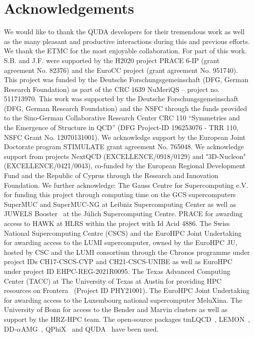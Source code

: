 \documentclass[a4paper,11pt]{article}
\begin{document}
\section{Acknowledgements}
{
\small
We would like to thank the QUDA developers for their tremendous work as well as the many pleasant and productive interactions during this and previous efforts. 
We thank the ETMC for the most enjoyable collaboration. 
For part of this work. S.B. and J.F. were supported by the H2020 project PRACE 6-IP (grant agreement No. 82376) and the EuroCC project (grant agreement No. 951740).
This project was funded by the Deutsche Forschungsgemeinschaft (DFG, German Research Foundation) as part of the CRC 1639 NuMeriQS – project no. 511713970. 
This work was supported by the Deutsche Forschungsgemeinschaft (DFG, German Research Foundation) and the NSFC through the funds provided to the Sino-German Collaborative Research Center CRC 110 “Symmetries and the Emergence of Structure in QCD” (DFG Project-ID 196253076 - TRR 110, NSFC Grant No. 12070131001).
We acknowledge support by the European Joint Doctorate program STIMULATE grant agreement No. 765048.
We acknowledge support from projects NextQCD (EXCELLENCE/0918/0129) and "3D-Nucleon" (EXCELLENCE/0421/0043), co-funded by the European Regional Development Fund and the Republic of Cyprus through the Research and Innovation Foundation. 
We further acknowledge: The Gauss Centre for Supercomputing e.V. for funding this project through computing time on the GCS supercomputers SuperMUC and SuperMUC-NG at Leibniz Supercomputing Center as well as JUWELS Booster~\cite{JUWELS,BOOSTER} at the Jülich Supercomputing Centre.
PRACE for awarding access to HAWK at HLRS within the project with Id Acid 4886. 
The Swiss National Supercomputing Centre (CSCS) and the EuroHPC Joint Undertaking for awarding access to the LUMI supercomputer, owned by the EuroHPC JU, hosted by CSC and the LUMI consortium through the Chronos programme under project IDs CH17-CSCS-CYP and CH21-CSCS-UNIBE as well as EuroHPC under project ID EHPC-REG-2021R0095.
The Texas Advanced Computing Center (TACC) at The University of Texas at Austin for providing HPC resources on Frontera~\cite{FRONTERA} (Project ID PHY21001).
The EuroHPC Joint Undertaking for awarding access to the Luxembourg national supercomputer MeluXina.
The University of Bonn for access to the Bender and Marvin clusters as well as support by the HRZ-HPC team.
The open-source packages tmLQCD~\cite{Jansen:2009xp,Abdel-Rehim:2013wba,Deuzeman:2013xaa,Kostrzewa:2022hsv,tmLQCD_mg_tune}, LEMON~\cite{Deuzeman:2011wz}, DD-$\alpha$AMG~\cite{Frommer:2013fsa,Alexandrou:2016izb,Bacchio:2017pcp,Alexandrou:2018wiv}, QPhiX~\cite{qphix13,qphix14,qphix16,Schrock:2015gik} and QUDA~\cite{Clark:2009wm,Babich:2011np,Clark:2016rdz} have been used.
}


{\footnotesize

}
\end{document}
